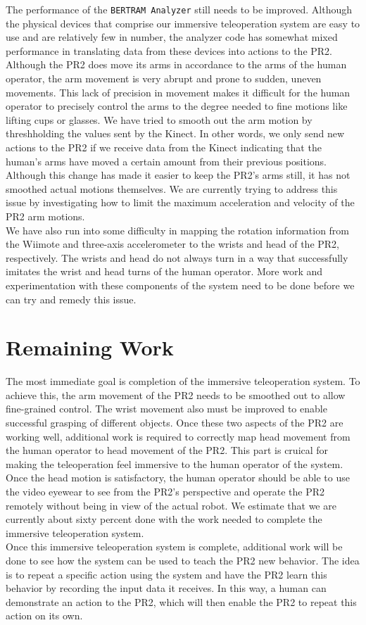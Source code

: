 \documentclass{sig-alternate}
\begin{document}
\indent The performance of the {\tt BERTRAM Analyzer} still needs to be improved. Although the physical devices that comprise our immersive teleoperation system are easy to use and are relatively few in number, the analyzer code has somewhat mixed performance in translating data from these devices into actions to the PR2. Although the PR2 does move its arms in accordance to the arms of the human operator, the arm movement is very abrupt and prone to sudden, uneven movements. This lack of precision in movement makes it difficult for the human operator to precisely control the arms to the degree needed to fine motions like lifting cups or glasses. We have tried to smooth out the arm motion by threshholding the values sent by the Kinect. In other words, we only send new actions to the PR2 if we receive data from the Kinect indicating that the human's arms have moved a certain amount from their previous positions. Although this change has made it easier to keep the PR2's arms still, it has not smoothed actual motions themselves. We are currently trying to address this issue by investigating how to limit the maximum acceleration and velocity of the PR2 arm motions.\\
\indent We have also run into some difficulty in mapping the rotation information from the Wiimote and three-axis accelerometer to the wrists and head of the PR2, respectively. The wrists and head do not always turn in a way that successfully imitates the wrist and head turns of the human operator. More work and experimentation with these components of the system need to be done before we can try and remedy this issue. 

\section{Remaining Work}
\label{sec:remaining_work}

\indent The most immediate goal is completion of the immersive teleoperation system. To achieve this, the arm movement of the PR2 needs to be smoothed out to allow fine-grained control. The wrist movement also must be improved to enable successful grasping of different objects. Once these two aspects of the PR2 are working well, additional work is required to correctly map head movement from the human operator to head movement of the PR2. This part is cruical for making the teleoperation feel immersive to the human operator of the system. Once the head motion is satisfactory, the human operator should be able to use the video eyewear to see from the PR2's perspective and operate the PR2 remotely without being in view of the actual robot. We estimate that we are currently about sixty percent done with the work needed to complete the immersive teleoperation system.\\
\indent Once this immersive teleoperation system is complete, additional work will be done to see how the system can be used to teach the PR2 new behavior. The idea is to repeat a specific action using the system and have the PR2 learn this behavior by recording the input data it receives. In this way, a human can demonstrate an action to the PR2, which will then enable the PR2 to repeat this action on its own.
\end{document}
